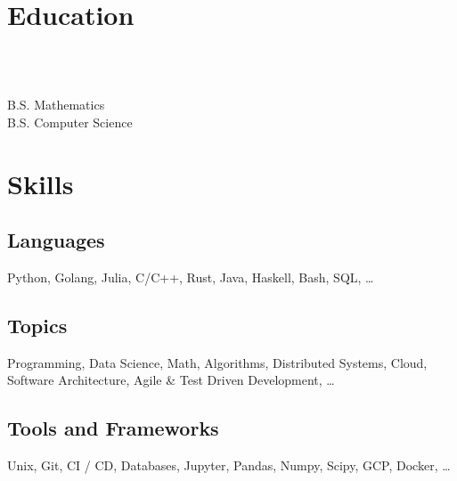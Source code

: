 \documentclass{tc_cv}
\begin{document}

\begin{minipage}[t]{0.3\linewidth}

  \vspace{1.5em}
  \section{Education}
  \\
  \date{Fall 2011 --- Spring 2016}\vspace{0.25em}\\
  \faGraduationCap \hspace{1ex} B.S. Mathematics\\
  \faGraduationCap \hspace{1ex} B.S. Computer Science

  \vspace{1.5em}
  \section{Skills}
  \subsection{Languages}
  Python,
  Golang,
  Julia,
  C/C++,
  Rust,
  Java,
  Haskell,
  Bash,
  SQL,
  \ldots

  \vspace{0.25em}
  \subsection{Topics}
  Programming,
  Data Science,
  Math,
  Algorithms,
  Distributed Systems,
  Cloud,
  Software Architecture,
  Agile \& Test Driven Development,
  \ldots

  \vspace{0.25em}
  \subsection{Tools and Frameworks}
  Unix,
  Git,
  CI / CD,
  Databases,
  Jupyter,
  Pandas, Numpy, Scipy,
  GCP,
  Docker,
  \ldots


\end{minipage}
\end{document}
